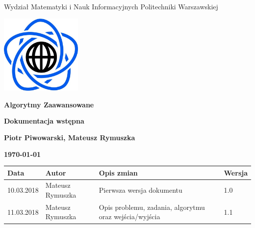 \documentclass[10pt,a4paper]{article}
\begin{document}
	\begin{titlepage}
		\begin{center}
			{\fontsize{14}{12}\selectfont Wydział Matematyki i Nauk Informacyjnych Politechniki Warszawskiej}
			
		\end{center}
		
		\vspace{1cm}
		\begin{center}
			\includegraphics[width=0.3\textwidth]{images/logo.png}
		\end{center}
		\vspace{3cm}
		
		\begin{center}
			\textbf{{\fontsize{26}{12}\selectfont Algorytmy Zaawansowane}}
			
			\vspace{2cm}
			\textbf{{\fontsize{22}{12}\selectfont Dokumentacja wstępna}}
			\vspace{1cm}
			
			\textbf{{\fontsize{13.5}{12}\selectfont Piotr Piwowarski, Mateusz Rymuszka}}
			
			\vspace{6cm}
			\textbf{{\fontsize{13.5}{12}\selectfont \today}}
		\end{center}  
	\end{titlepage}
	
	{\fontsize{13.5}{12}\selectfont
		\tableofcontents
		\vspace{1cm}
		{\renewcommand{\arraystretch}{2.0}
			
			\begin{tabularx}{\textwidth}{|l|l|X|l|}
				\hline 
				Data & Autor & Opis zmian & Wersja\\
				\hline
				10.03.2018 & Mateusz Rymuszka & Pierwsza wersja dokumentu & 1.0 \\
				\hline
				11.03.2018 & Mateusz Rymuszka & Opis problemu, zadania, algorytmu oraz wejścia/wyjścia & 1.1 \\
				\hline
			\end{tabularx} 
	}}
	
\end{document}
